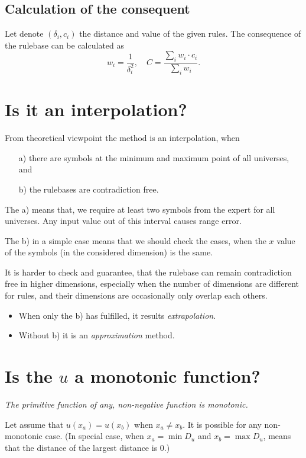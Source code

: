 \documentclass[a4paper,12pt]{article}
\begin{document}
\subsection{Calculation of the consequent}

Let denote $(\delta_i, c_i)$ the distance and value of the given rules.
The consequence of the rulebase can be calculated as
\[
w_i = \dfrac{1}{\delta_i^2},
\quad
C = \dfrac{\sum_i w_i \cdot c_i}{\sum_i w_i}.
\]

\section{Is it an interpolation?}

From theoretical viewpoint the method is an interpolation, when
\begin{itemize}
    \item[a)] there are symbols at the minimum and maximum point of all universes, and
    \item[b)] the rulebases are contradiction free.
\end{itemize}
The a) means that, we require at least two symbols from the expert for all universes. Any input value out of this interval causes range error.

The b) in a simple case means that we should check the cases, when the $x$ value of the symbols (in the considered dimension) is the same.

It is harder to check and guarantee, that the rulebase can remain contradiction free in higher dimensions, especially when the number of dimensions are different for rules, and their dimensions are occasionally only overlap each others.

\begin{itemize}
    \item When only the b) has fulfilled, it results \textit{extrapolation}.
    \item Without b) it is an \textit{approximation} method.
\end{itemize}

\section{Is the $u$ a monotonic function?}

\emph{The primitive function of any, non-negative function is monotonic.}

Let assume that $u(x_a) = u(x_b)$ when $x_a \neq x_b$. It is possible for any non-monotonic case. (In special case, when $x_a = \min D_u$ and $x_b = \max D_u$, means that the distance of the largest distance is 0.)
\end{document}
